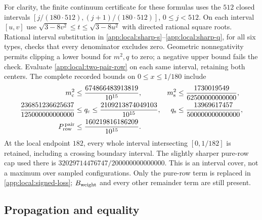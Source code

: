 For clarity, the finite continuum certificate for these formulas uses
the $512$ closed intervals
$[j/(180\cdot512),(j+1)/(180\cdot512)]$, $0\le j<512$.
On each interval $[u,v]$ use
$\sqrt{3-8v^2}\le t\le\sqrt{3-8u^2}$ with directed rational square roots.
Rational interval substitution in
\eqref{app:local:sharp-s}--\eqref{app:local:sharp-q}, for all six types,
checks that every denominator excludes zero. Geometric nonnegativity
permits clipping a lower bound for $m^2,q$ to zero; a negative upper
bound fails the check. Evaluate \eqref{app:local:two-pair-row} on each
same interval, retaining both centers.
The complete recorded bounds on $0\le x\le1/180$ include
\begin{align}
 m_{\mathrm c}^2&\le\frac{674866483913819}{10^{15}},&
 m_{\mathrm s}^2&\le\frac{1730019549}{62500000000000},\nonumber\\
 \frac{236851236625637}{125000000000000}
 &\le q_{\mathrm c}\le\frac{2109213874049103}{10^{15}},&
 q_{\mathrm s}&\le\frac{13969617457}{500000000000000},\nonumber\\
 P_{\rm row}^{\,\rm pair}&\le\frac{160219816186209}{10^{15}}.
 &&\label{app:local:sharp-uniform}
\end{align}
At the local endpoint $182$, every whole interval intersecting
$[0,1/182]$ is retained, including a crossing boundary interval.
The slightly sharper pure-row cap used there is
$32029714476747/200000000000000$.
This is an interval cover, not a maximum over sampled configurations.
Only the pure-row term is replaced in \eqref{app:local:signed-loss};
$B_{\rm weight}$ and every other remainder term are still present.

\subsection{Propagation and equality}
\label{app:local:closure}

